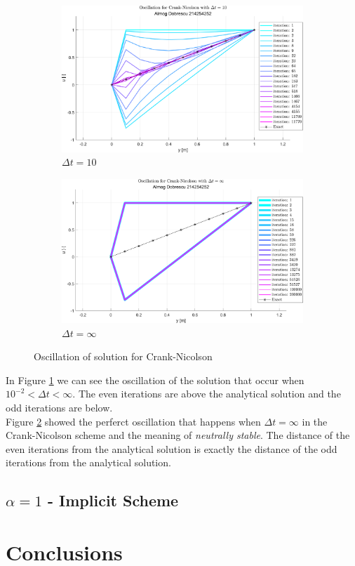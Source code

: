 \documentclass[11pt, a4paper]{article}
\begin{document}
\begin{figure}[H]
    \centering
    \begin{subfigure}[b]{.49\textwidth}
        \centering
        \includegraphics[width=\textwidth]{images/grap4.png}
        \caption{$\Delta t = 10$}
        \label{fig5A}
    \end{subfigure}
    \hfill
    \begin{subfigure}[b]{.49\textwidth}
        \centering
        \includegraphics[width=\textwidth]{images/grap6.png}
        \caption{$\Delta t = \infty$}
        \label{fig5B}
    \end{subfigure}
    \caption{Oscillation of solution for Crank-Nicolson}
    \label{fig5}
\end{figure}
\noindent In Figure \ref{fig5A} we can see the oscillation of the solution that occur when $ 10^{-2} < \Delta t < \infty$. The even iterations are above the analytical solution and the odd iterations are below.\\
Figure \ref{fig5B} showed the perferct oscillation that happens when $\Delta t=\infty$ in the Crank-Nicolson scheme and the meaning of \emph{neutrally stable}. The distance of the even iterations from the analytical solution is exactly the distance of the odd iterations from the analytical solution.

\subsection{$\alpha = 1$ - Implicit Scheme}

\newpage

\section{Conclusions}
\newpage
\end{document}

